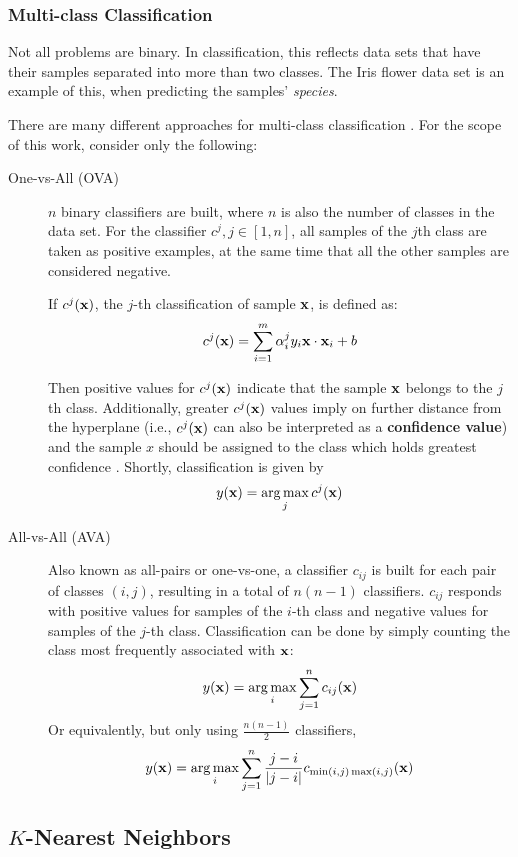 \subsubsection{Multi-class Classification}

Not all problems are binary. In classification, this reflects data sets that have their samples separated into more than two classes. The Iris flower data set is an example of this, when predicting the samples' {\em species}.

There are many different approaches for multi-class classification \cite{rif2008}. For the scope of this work, consider only the following:

\begin{description}
	\item[One-vs-All (OVA)] $n$ binary classifiers are built, where $n$ is also the number of classes in the data set. For the classifier $c^j, j \in [1, n]$, all samples of the $j$th class are taken as positive examples, at the same time that all the other samples are considered negative.

	If $c^j(\mathbf{x})$, the $j$-th classification of sample $\mathbf{x}$, is defined as:
	$$c^j(\mathbf{x}) = \sum_{i=1}^{m} \alpha_i^j y_i \mathbf{x} \cdot \mathbf{x}_i + b$$

	Then positive values for $c^j(\mathbf{x})$ indicate that the sample $\mathbf{x}$ belongs to the $j$th class. Additionally, greater $c^j(\mathbf{x})$ values imply on further distance from the hyperplane (i.e., $c^j(\mathbf{x})$ can also be interpreted as a \textbf{confidence value}) and the sample $x$ should be assigned to the class which holds greatest confidence \cite{ovacj}. Shortly, classification is given by
	$$ y(\mathbf{x}) = \operatorname*{arg\,max}_j{c^j(\mathbf{x})} $$	
	\item[All-vs-All (AVA)] Also known as all-pairs or one-vs-one, a classifier $c_{ij}$ is built for each pair of classes $(i, j)$, resulting in a total of $n(n-1)$ classifiers. $c_{ij}$ responds with positive values for samples of the $i$-th class and negative values for samples of the $j$-th class. Classification can be done by simply counting the class most frequently associated with $\mathbf{x}$:
	$$ y(\mathbf{x}) = \operatorname*{arg\,max}_i{\sum_{j=1}^{n} c_{ij}(\mathbf{x})} $$
	Or equivalently, but only using $\frac{n(n-1)}{2}$ classifiers,
	$$ y(\mathbf{x}) = \operatorname*{arg\,max}_i{\sum_{j=1}^{n} \frac{j-i}{|j-i|} c_{\min(i, j) \max(i, j)}(\mathbf{x})} $$
\end{description}

\subsection{$K$-Nearest Neighbors}


